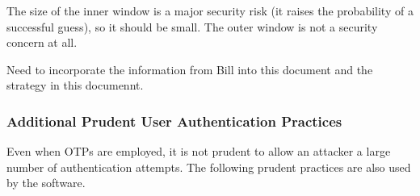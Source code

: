 The size of the inner window is a major security risk (it raises the probability
of a successful guess), so it should be small.  The outer window is not a security
concern at all.

Need to incorporate the information from Bill into this document and the
strategy in this documennt.


\subsubsection{Additional Prudent User Authentication Practices}
\label{ctbg0:sddc0:stfa0:saap0}

Even when OTPs are employed, it is not prudent to allow an attacker
a large number of authentication attempts.  The following 
prudent practices are also used by the \productbasename{} software.

